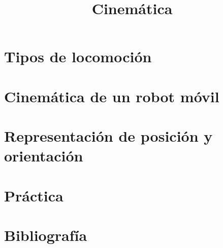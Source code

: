 \documentclass[aspectratio=169,compress]{beamer}
\title{Cinemática}
\author{}
\institute{Universidad Nacional de Rosario}
\date{}
\begin{document}
\frame{\titlepage}

\section{Tipos de locomoción}


\section{Cinemática de un robot móvil}


\section{Representación de posición y orientación}


\section{Práctica}


\section{Bibliografía}

\end{document}
